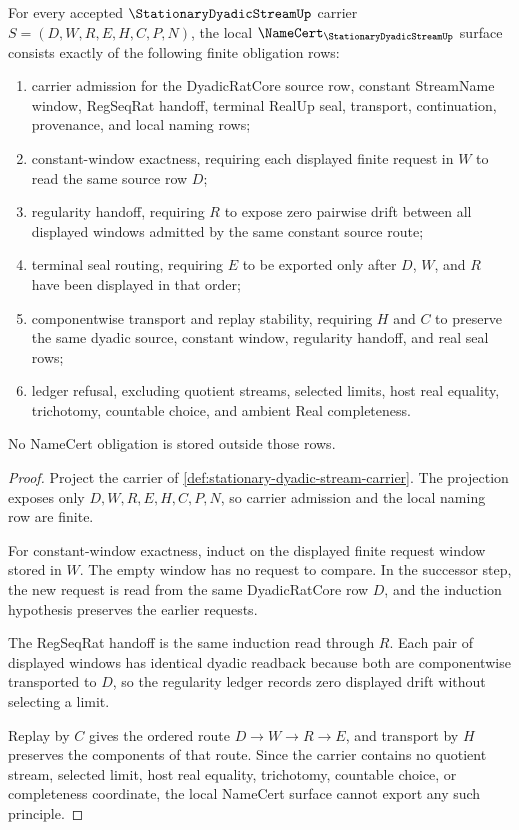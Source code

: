 \begin{theorem}
\label{thm:stationary-dyadic-stream-namecert-obligations}
For every accepted $\StationaryDyadicStreamUp$ carrier $S=(D,W,R,E,H,C,P,N)$, the local $\NameCert_{\StationaryDyadicStreamUp}$ surface consists exactly of the following finite obligation rows:
\begin{enumerate}
\item carrier admission for the DyadicRatCore source row, constant StreamName window, RegSeqRat handoff, terminal RealUp seal, transport, continuation, provenance, and local naming rows;
\item constant-window exactness, requiring each displayed finite request in $W$ to read the same source row $D$;
\item regularity handoff, requiring $R$ to expose zero pairwise drift between all displayed windows admitted by the same constant source route;
\item terminal seal routing, requiring $E$ to be exported only after $D$, $W$, and $R$ have been displayed in that order;
\item componentwise transport and replay stability, requiring $H$ and $C$ to preserve the same dyadic source, constant window, regularity handoff, and real seal rows;
\item ledger refusal, excluding quotient streams, selected limits, host real equality, trichotomy, countable choice, and ambient Real completeness.
\end{enumerate}
No NameCert obligation is stored outside those rows.
\end{theorem}
\begin{proof}
Project the carrier of \autoref{def:stationary-dyadic-stream-carrier}. The projection exposes only $D,W,R,E,H,C,P,N$, so carrier admission and the local naming row are finite.

For constant-window exactness, induct on the displayed finite request window stored in $W$. The empty window has no request to compare. In the successor step, the new request is read from the same DyadicRatCore row $D$, and the induction hypothesis preserves the earlier requests.

The RegSeqRat handoff is the same induction read through $R$. Each pair of displayed windows has identical dyadic readback because both are componentwise transported to $D$, so the regularity ledger records zero displayed drift without selecting a limit.

Replay by $C$ gives the ordered route $D \to W \to R \to E$, and transport by $H$ preserves the components of that route. Since the carrier contains no quotient stream, selected limit, host real equality, trichotomy, countable choice, or completeness coordinate, the local NameCert surface cannot export any such principle.
\end{proof}

